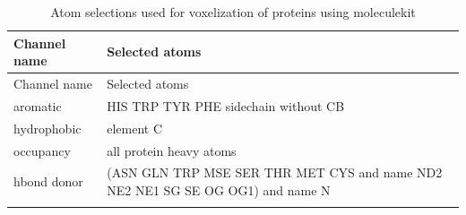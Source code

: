 \documentclass[  ASAPversion,
  ,
  9pt]{elife}
\newenvironment{tablenos:tagged-table}[1][]{
  \let\oldthetable\thetable
  \let\oldtheHtable\theHtable
  \renewcommand{\thetable}{#1}
  \renewcommand{\theHtable}{#1}
}{
  \let\thetable\oldthetable
  \let\theHtable\oldtheHtable
  \addtocounter{table}{-1}
}
\begin{document}
\begin{tablenos:tagged-table}[S2]

\begin{longtable}[]{@{}ll@{}}
\caption{Atom selections used for voxelization of proteins using moleculekit \label{tbl:voxelchannels}}\tabularnewline
\toprule
\begin{minipage}[b]{0.14\columnwidth}\raggedright
Channel name\strut
\end{minipage} & \begin{minipage}[b]{0.81\columnwidth}\raggedright
Selected atoms\strut
\end{minipage}\tabularnewline
\midrule
\endfirsthead
\toprule
\begin{minipage}[b]{0.14\columnwidth}\raggedright
Channel name\strut
\end{minipage} & \begin{minipage}[b]{0.81\columnwidth}\raggedright
Selected atoms\strut
\end{minipage}\tabularnewline
\midrule
\endhead
\begin{minipage}[t]{0.14\columnwidth}\raggedright
aromatic\strut
\end{minipage} & \begin{minipage}[t]{0.81\columnwidth}\raggedright
HIS TRP TYR PHE sidechain without CB\strut
\end{minipage}\tabularnewline
\begin{minipage}[t]{0.14\columnwidth}\raggedright
hydrophobic\strut
\end{minipage} & \begin{minipage}[t]{0.81\columnwidth}\raggedright
element C\strut
\end{minipage}\tabularnewline
\begin{minipage}[t]{0.14\columnwidth}\raggedright
occupancy\strut
\end{minipage} & \begin{minipage}[t]{0.81\columnwidth}\raggedright
all protein heavy atoms\strut
\end{minipage}\tabularnewline
\begin{minipage}[t]{0.14\columnwidth}\raggedright
hbond donor\strut
\end{minipage} & \begin{minipage}[t]{0.81\columnwidth}\raggedright
(ASN GLN TRP MSE SER THR MET CYS and name ND2 NE2 NE1 SG SE OG OG1) and name N\strut
\end{minipage}\tabularnewline
\begin{minipage}[t]{0.14\columnwidth}\raggedright

\end{minipage}
\end{longtable}
\end{tablenos:tagged-table}
\end{document}
